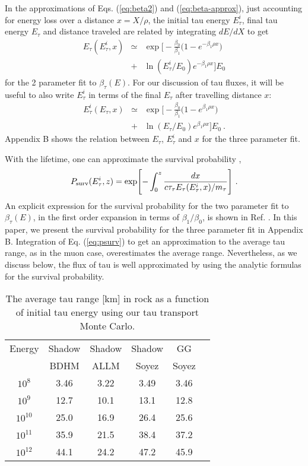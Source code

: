 \documentclass[aps,10pt,twocolumn,tightenlines]{revtex4-1}
\begin{document}
In the approximations of
Eqs. (\ref{eq:beta2}) and (\ref{eq:beta-approx}),
just accounting for energy loss over a distance $x=X/\rho$, the initial tau energy $E_\tau^i$, final tau energy $E_\tau$ and distance traveled are related
by integrating $dE/dX$ to get
\begin{eqnarray}
\nonumber
E_\tau(E_\tau^i,x) &\simeq&\exp\Biggl[ -\frac{\beta_0}{\beta_1}\bigl( 1-e^{-\beta_1\rho x}\bigr)\\
&+& \ln(E_\tau^i/E_0)e^{-\beta_1\rho x}\Biggr] E_0
\label{eq:etau}
\end{eqnarray}
for the 2 parameter fit to $\beta_\tau(E)$. For our discussion of tau fluxes, it will be useful to also write
$E_\tau^i$ in terms of the final $E_\tau$ after travelling distance $x$:
\begin{eqnarray}
\nonumber
E_\tau^i(E_\tau,x) &\simeq&\exp\Biggl[ -\frac{\beta_0}{\beta_1}\bigl( 1-e^{\beta_1\rho x}\bigr)\\
&+& \ln(E_\tau/E_0)e^{\beta_1\rho x}\Biggr] E_0 \ .
\label{eq:etaui}
\end{eqnarray}
Appendix B shows the relation between $E_\tau$, $E_\tau^i$ and $x$ for the three parameter fit.

With the lifetime, one can approximate the survival probability \cite{Reya:2005vh,Bigas:2008ff}, 
\begin{equation}
\label{eq:psurv}
P_{\rm surv} (E_\tau^i,z)= \exp\Biggl[ -\int _0^z\frac{dx}{c\tau_\tau E_\tau(E_\tau^i,x)/m_\tau}\Biggr]\ .
\end{equation}
An explicit expression for the survival probability for the two parameter fit to $\beta_\tau(E)$, in the first order expansion in terms of $\beta_{1}/\beta_0$, 
is shown in Ref. \cite{Dutta:2005yt}. In this paper, we present the survival probability for the three parameter fit in Appendix B.
Integration of Eq. (\ref{eq:psurv}) to get an approximation to the average tau range, as in the muon case, overestimates
the average range. Nevertheless, as we discuss below, the flux of tau is well approximated by using the analytic formulas for 
the survival probability.



\begin{table}[htp]
\caption{The average tau range [km] in rock as a function of initial tau energy using our tau transport Monte Carlo.}
\begin{center}
\begin{tabular}{|c|c|c|c|c|c|}
\hline
Energy & Shadow & Shadow & Shadow  & GG\\
& BDHM & ALLM & Soyez & Soyez\\
\hline 
\hline 
 $10^8$ & 3.46 & 3.22 & 3.49 & 3.46\\
\hline 
 $10^9$ & 12.7 & 10.1 & 13.1 & 12.8\\
\hline 
 $10^{10}$ & 25.0 & 16.9 & 26.4 & 25.6\\
\hline 
 $10^{11}$ & 35.9 & 21.5 & 38.4 &37.2\\
\hline 
 $10^{12}$ & 44.1 & 24.2 & 47.2 & 45.9\\
 \hline
 \end{tabular}
 \end{center}
 \label{table:taurangerock}
 \end{table}
\end{document}
